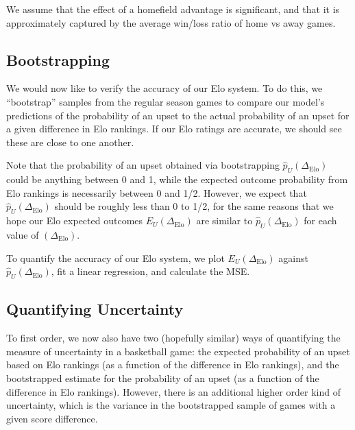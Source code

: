 \documentclass{article}
\begin{document}
We assume that the effect of a homefield advantage is significant, and that it is approximately captured by the average win/loss ratio of home vs away games.
\subsection{Bootstrapping}
We would now like to verify the accuracy of our Elo system. To do this, we ``bootstrap'' \cite{builtinWhatBootstrapping} samples from the regular season games to compare our model's predictions of the probability of an upset to the actual probability of an upset for a given difference in Elo rankings. If our Elo ratings are accurate, we should see these are close to one another.

Note that the probability of an upset obtained via bootstrapping $\hat{p}_U(\Delta_{\text{Elo}})$ could be anything between 0 and 1, while the expected outcome probability from Elo rankings is necessarily between 0 and 1/2. However, we expect that $\hat{p}_U(\Delta_{\text{Elo}})$ should be roughly less than 0 to 1/2, for the same reasons that we hope our Elo expected outcomes $E_U(\Delta_{\text{Elo}})$ are similar to $\hat{p}_U(\Delta_{\text{Elo}})$ for each value of $(\Delta_{\text{Elo}})$. 


To quantify the accuracy of our Elo system, we plot $E_U(\Delta_{\text{Elo}})$ against $\hat{p}_U(\Delta_{\text{Elo}})$, fit a linear regression, and calculate the MSE.  

\subsection{Quantifying Uncertainty}
To first order, we now also have two (hopefully similar) ways of quantifying the measure of uncertainty in a basketball game: the expected probability of an upset based on Elo rankings (as a function of the difference in Elo rankings), and the bootstrapped estimate for the probability of an upset (as a function of the difference in Elo rankings). However, there is an additional higher order kind of uncertainty, which is the variance in the bootstrapped sample of games with a given score difference. 

\end{document}
